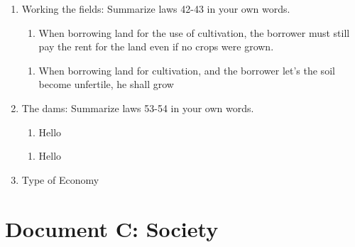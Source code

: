 \documentclass[12pt]{article}
\begin{document}
\begin{enumerate}

\item{Working the fields: Summarize laws 42-43 in your own words.}
\begin{enumerate}[42.]
    \item{When borrowing land for the use of cultivation, the borrower must
    still pay the rent for the land even if no crops were grown.}
\end{enumerate}
\begin{enumerate}[43.]
    \item{When borrowing land for cultivation, and the borrower let's the soil become
    unfertile, he shall grow}
\end{enumerate}

\item{The dams: Summarize laws 53-54 in your own words.}
\begin{enumerate}[53.]
    \item{Hello}
\end{enumerate}
\begin{enumerate}[54.]
    \item{Hello}
\end{enumerate}

    \item{Type of Economy}
\end{enumerate}

\section{Document C: Society}

 
\end{document}
